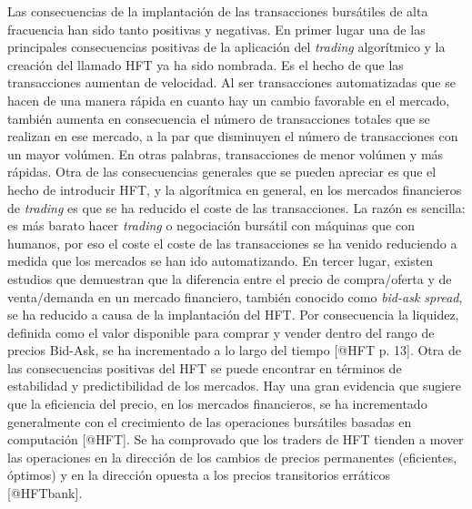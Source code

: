\documentclass[]{article}
\begin{document}
Las consecuencias de la implantación de las transacciones bursátiles de
alta fracuencia han sido tanto positivas y negativas. En primer lugar
una de las principales consecuencias positivas de la aplicación del
\emph{trading} algorítmico y la creación del llamado HFT ya ha sido
nombrada. Es el hecho de que las transacciones aumentan de velocidad. Al
ser transacciones automatizadas que se hacen de una manera rápida en
cuanto hay un cambio favorable en el mercado, también aumenta en
consecuencia el número de transacciones totales que se realizan en ese
mercado, a la par que disminuyen el número de transacciones con un mayor
volúmen. En otras palabras, transacciones de menor volúmen y más
rápidas. Otra de las consecuencias generales que se pueden apreciar es
que el hecho de introducir HFT, y la algorítmica en general, en los
mercados financieros de \emph{trading} es que se ha reducido el coste de
las transacciones. La razón es sencilla: es más barato hacer
\emph{trading} o negociación bursátil con máquinas que con humanos, por
eso el coste el coste de las transacciones se ha venido reduciendo a
medida que los mercados se han ido automatizando. En tercer lugar,
existen estudios que demuestran que la diferencia entre el precio de
compra/oferta y de venta/demanda en un mercado financiero, también
conocido como \emph{bid-ask spread}, se ha reducido a causa de la
implantación del HFT. Por consecuencia la liquidez, definida como el
valor disponible para comprar y vender dentro del rango de precios
Bid-Ask, se ha incrementado a lo largo del tiempo {[}@HFT p. 13{]}. Otra
de las consecuencias positivas del HFT se puede encontrar en términos de
estabilidad y predictibilidad de los mercados. Hay una gran evidencia
que sugiere que la eficiencia del precio, en los mercados financieros,
se ha incrementado generalmente con el crecimiento de las operaciones
bursátiles basadas en computación {[}@HFT{]}. Se ha comprovado que los
traders de HFT tienden a mover las operaciones en la dirección de los
cambios de precios permanentes (eficientes, óptimos) y en la dirección
opuesta a los precios transitorios erráticos {[}@HFTbank{]}.

\setlength\parskip{5ex}
\end{document}
